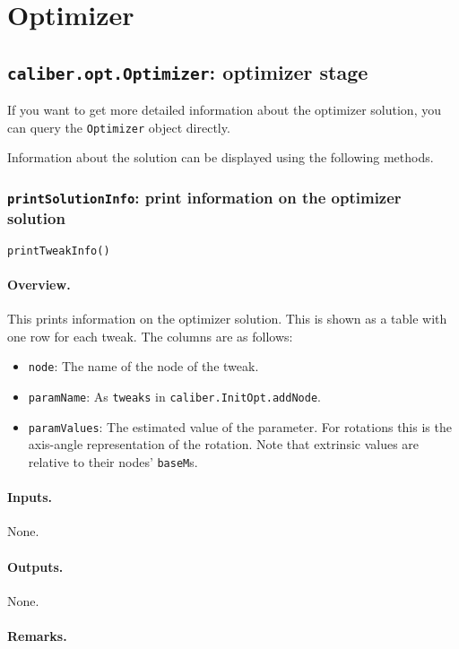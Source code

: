 \section{Optimizer}
\label{sec:optimizer}

\subsection{\texttt{caliber.opt.Optimizer}: optimizer stage}
If you want to get more detailed information about the optimizer solution,
you can query the \texttt{Optimizer} object directly.

Information about the solution can be displayed using the following methods.

\subsubsection{\texttt{printSolutionInfo}: print information on the optimizer solution}
\texttt{printTweakInfo()}
\paragraph{Overview.} This prints information on the optimizer solution.
This is shown as a table with one row for each tweak. The columns are as follows:
\begin{itemize}
	\item \texttt{node}: The name of the node of the tweak.
	\item \texttt{paramName}: As \texttt{tweaks} in \texttt{caliber.InitOpt.addNode}.
	\item \texttt{paramValues}: The estimated value of the parameter. For rotations
		this is the axis-angle representation of the rotation. Note that extrinsic
        values are relative to their nodes' \texttt{baseM}s.
\end{itemize}
\paragraph{Inputs.} None.
\paragraph{Outputs.} None.
\paragraph{Remarks.}
